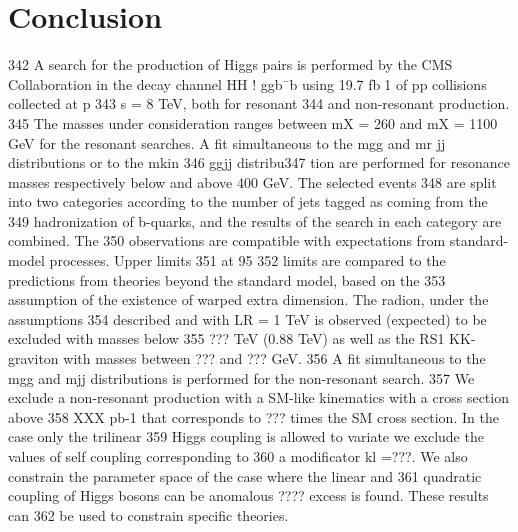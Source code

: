 
\chapter{Conclusion\label{ch:conclusion}}

342 A search for the production of Higgs pairs is performed by the CMS Collaboration in the decay
channel HH ! ggb¯b using 19.7 fb􀀀1 of pp collisions collected at
p
343 s = 8 TeV, both for resonant
344 and non-resonant production.
345 The masses under consideration ranges between mX = 260 and mX = 1100 GeV for the resonant
searches. A fit simultaneous to the mgg and mr
jj distributions or to the mkin
346 ggjj distribu347
tion are performed for resonance masses respectively below and above 400 GeV. The selected
events 348 are split into two categories according to the number of jets tagged as coming from the
349 hadronization of b-quarks, and the results of the search in each category are combined. The
350 observations are compatible with expectations from standard-model processes. Upper limits
351 at 95%
352 limits are compared to the predictions from theories beyond the standard model, based on the
353 assumption of the existence of warped extra dimension. The radion, under the assumptions
354 described and with LR = 1 TeV is observed (expected) to be excluded with masses below
355 ??? TeV (0.88 TeV) as well as the RS1 KK-graviton with masses between ??? and ??? GeV.
356 A fit simultaneous to the mgg and mjj distributions is performed for the non-resonant search.
357 We exclude a non-resonant production with a SM-like kinematics with a cross section above
358 XXX pb-1 that corresponds to ??? times the SM cross section. In the case only the trilinear
359 Higgs coupling is allowed to variate we exclude the values of self coupling corresponding to
360 a modificator kl =???. We also constrain the parameter space of the case where the linear and
361 quadratic coupling of Higgs bosons can be anomalous ???? excess is found. These results can
362 be used to constrain specific theories.
